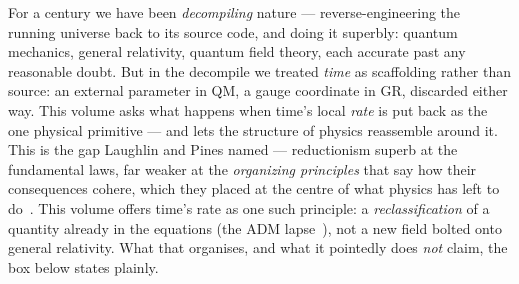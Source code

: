 \documentclass[11pt]{article}
\begin{document}
\smallskip
{}

\bigskip

\noindent For a century we have been \emph{decompiling} nature --- reverse-engineering the running
universe back to its source code, and doing it superbly: quantum mechanics, general relativity,
quantum field theory, each accurate past any reasonable doubt. But in the decompile we treated
\emph{time} as scaffolding rather than source: an external parameter in QM, a gauge coordinate in
GR, discarded either way. This volume asks what happens when time's local \emph{rate} is put back as
the one physical primitive --- and lets the structure of physics reassemble around it. This is the gap
Laughlin and Pines named --- reductionism superb at the fundamental laws, far weaker at the
\emph{organizing principles} that say how their consequences cohere, which they placed at the centre of
what physics has left to do~\cite{LaughlinPines2000}. This volume offers time's rate as one such principle:
a \emph{reclassification} of a quantity already in the equations (the ADM lapse~\cite{ADM1962}), not a new
field bolted onto general relativity. What that organises, and what it pointedly does \emph{not} claim, the
box below states plainly.
\end{document}
